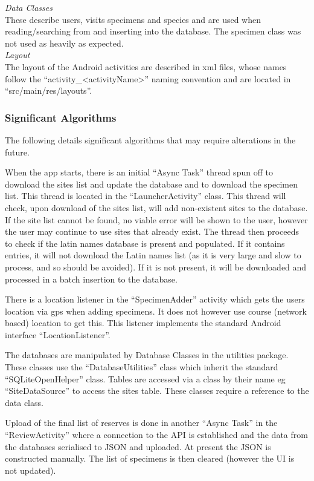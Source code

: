         \emph{Data Classes}\\
        These describe users, visits specimens and species and are used when reading/searching from and inserting into the database. The specimen class was not used as heavily as expected.\\

        \emph{Layout}\\
        The layout of the Android activities are described in xml files, whose names follow the ``activity\_\textless activityName\textgreater'' naming convention and are located in ``src/main/res/layouts''.

    \subsubsection{Significant Algorithms}
        The following details significant algorithms that may require alterations in the future.

        When the app starts, there is an initial ``Async Task'' thread spun off to download the sites list and update the database and to download the specimen list. This thread is located in the ``LauncherActivity'' class. This thread will check, upon download of the sites list, will add non-existent sites to the database. If the site list cannot be found, no viable error will be shown to the user, however the user may continue to use sites that already exist. The thread then proceeds to check if the latin names database is present and populated. If it contains entries, it will not download the Latin names list (as it is very large and slow to process, and so should be avoided). If it is not present, it will be downloaded and processed in a batch insertion to the database.

        There is a location listener in the ``SpecimenAdder'' activity which gets the users location via gps when adding specimens. It does not however use course (network based) location to get this. This listener implements the standard Android interface ``LocationListener''. 

        The databases are manipulated by Database Classes in the utilities package. These classes use the ``DatabaseUtilities'' class which inherit the standard ``SQLiteOpenHelper'' class. Tables are accessed via a class by their name eg ``SiteDataSource'' to access the sites table. These classes require a reference to the data class.

        Upload of the final list of reserves is done in another ``Async Task'' in the ``ReviewActivity'' where a connection to the API is established and the data from the databases serialised to JSON and uploaded. At present the JSON is constructed manually. The list of specimens is then cleared (however the UI is not updated).
    
